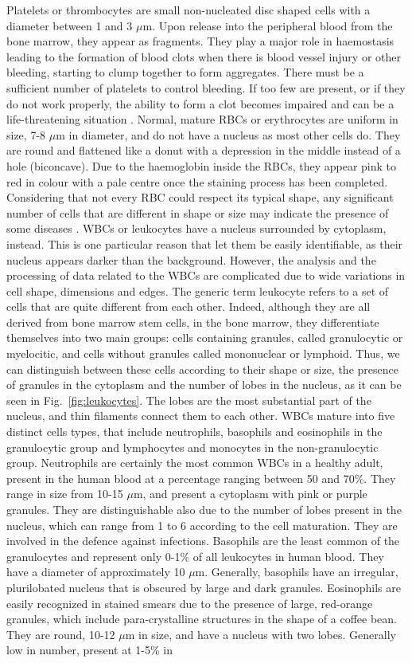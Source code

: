 \documentclass[final,a4paper,12pt,english]{UnicaPhdThesis3}
\begin{document}
Platelets or thrombocytes are small non-nucleated disc shaped cells with a diameter between 1 and 3 $\mu$m. Upon release into the peripheral blood from the bone marrow, they appear as fragments. They play a major role in haemostasis leading to the formation of blood clots when there is blood vessel injury or other bleeding, starting to clump together to form aggregates. There must be a sufficient number of platelets to control bleeding. If too few are present, or if they do not work properly, the ability to form a clot becomes impaired and can be a life-threatening situation \cite{Ciesla}. Normal, mature RBCs or erythrocytes are uniform in size, 7-8 $\mu$m in diameter,  and do not have a nucleus as most other cells do. They are round and flattened like a donut with a depression in the middle instead of a hole (biconcave). Due to the haemoglobin inside the RBCs, they appear pink to red in colour with a pale centre once the staining process has been completed. Considering that not every RBC could respect its typical shape, any significant number of cells that are different in shape or size may indicate the presence of some diseases \cite{Erhabor}. WBCs or leukocytes have a nucleus surrounded by cytoplasm, instead. This is one particular reason that let them be easily identifiable, as their nucleus appears darker than the background. However, the analysis and the processing of data related to the WBCs are complicated due to wide variations in cell shape, dimensions and edges. The generic term leukocyte refers to a set of cells that are quite different from each other. Indeed, although they are all derived from bone marrow stem cells, in the bone marrow, they differentiate themselves into two main groups: cells containing granules, called granulocytic or myelocitic, and cells without granules called mononuclear or lymphoid. Thus, we can distinguish between these cells according to their shape or size, the presence of granules in the cytoplasm and the number of lobes in the nucleus, as it can be seen in Fig.~\ref{fig:leukocytes}. The lobes are the most substantial part of the nucleus, and thin filaments connect them to each other. WBCs mature into five distinct cells types, that include neutrophils, basophils and eosinophils in the granulocytic group and lymphocytes and monocytes in the non-granulocytic group. Neutrophils are certainly the most common WBCs in a healthy adult, present in the human blood at a percentage ranging between 50 and 70\%. They range in size from 10-15 $\mu$m, and present a cytoplasm with pink or purple granules. They are distinguishable also due to the number of lobes present in the nucleus, which can range from 1 to 6 according to the cell maturation. They are involved in the defence against infections. Basophils are the least common of the granulocytes and represent only 0-1\% of all leukocytes in human blood. They have a diameter of approximately 10 $\mu$m. Generally, basophils have an irregular, plurilobated nucleus that is obscured by large and dark granules. Eosinophils are easily recognized in stained smears due to the presence of large, red-orange granules, which include para-crystalline structures in the shape of a coffee bean. They are round, 10-12 $\mu$m in size, and have a nucleus with two lobes. Generally low in number, present at 1-5\% in 
\end{document}
